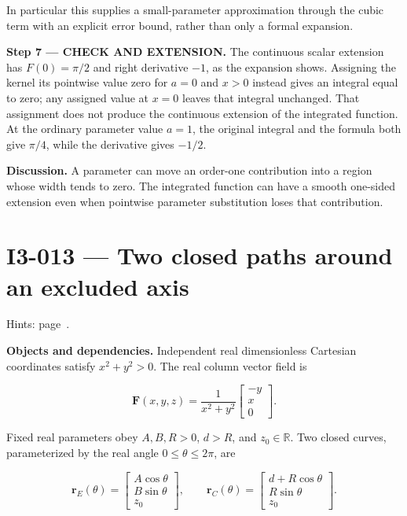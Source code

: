 \documentclass[11pt,oneside,openany]{book}
\begin{document}
In particular this supplies a small-parameter approximation through the cubic term with an explicit error bound, rather than only a formal expansion.

\endgroup
\textbf{Step 7 --- CHECK AND EXTENSION.} The continuous scalar extension has \(F(0)=\pi/2\) and right derivative \(-1\), as the expansion shows. Assigning the kernel its pointwise value zero for \(a=0\) and \(x>0\) instead gives an integral equal to zero; any assigned value at \(x=0\) leaves that integral unchanged. That assignment does not produce the continuous extension of the integrated function. At the ordinary parameter value \(a=1\), the original integral and the formula both give \(\pi/4\), while the derivative gives \(-1/2\).

\textbf{Discussion.} A parameter can move an order-one contribution into a region whose width tends to zero. The integrated function can have a smooth one-sided extension even when pointwise parameter substitution loses that contribution.
\clearpage
\section{I3-013 --- Two closed paths around an excluded axis}
\label{problem:I3-013}
{\small Hints: page~\pageref{hints:I3-013}.}\par\medskip

\textbf{Objects and dependencies.} Independent real dimensionless Cartesian coordinates satisfy \(x^2+y^2>0\). The real column vector field is

\[
\mathbf F(x,y,z)=\frac{1}{x^2+y^2}\begin{bmatrix}-y\\x\\0\end{bmatrix}.
\]

Fixed real parameters obey \(A,B,R>0\), \(d>R\), and \(z_0\in\mathbb R\). Two closed curves, parameterized by the real angle \(0\le\theta\le2\pi\), are

\[
\mathbf r_E(\theta)=\begin{bmatrix}A\cos\theta\\B\sin\theta\\z_0\end{bmatrix},
\qquad
\mathbf r_C(\theta)=\begin{bmatrix}d+R\cos\theta\\R\sin\theta\\z_0\end{bmatrix}.
\]
\end{document}
